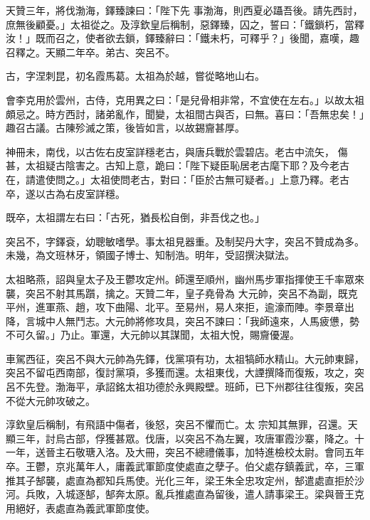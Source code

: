 \begin{pinyinscope}
 天贊三年，將伐渤海，鐸臻諫曰：「陛下先
 事渤海，則西夏必躡吾後。請先西討，庶無後顧憂。」太祖從之。及淳欽皇后稱制，惡鐸臻，囚之，誓曰：「鐵鎖朽，當釋汝！」既而召之，使者欲去鎖，鐸臻辭曰：「鐵未朽，可釋乎？」後聞，嘉嘆，趣召釋之。天顯二年卒。弟古、突呂不。



 古，字涅刺昆，初名霞馬葛。太祖為於越，嘗從略地山右。



 會李克用於雲州，古侍，克用異之曰：「是兒骨相非常，不宜使在左右。」以故太祖頗忌之。時方西討，諸弟亂作，聞變，太祖間古與否，曰無。喜曰：「吾無忠矣！」趣召古議。古陳殄滅之策，後皆如言，以故錫齎甚厚。



 神冊未，南伐，以古佐右皮室詳穩老古，與唐兵戰於雲碧店。老古中流矢，
 傷甚，太祖疑古陰害之。古知上意，跪曰：「陛下疑臣恥居老古麾下耶？及今老古在，請遣使問之。」太祖使問老古，對曰：「臣於古無可疑者。」上意乃釋。老古卒，遂以古為右皮室詳穩。



 既卒，太祖謂左右曰：「古死，猶長松自倒，非吾伐之也。」



 突呂不，字鐸袞，幼聰敏嗜學。事太祖見器重。及制契丹大字，突呂不贊成為多。未幾，為文班林牙，領國子博士、知制浩。明年，受詔撰決獄法。



 太祖略燕，詔與皇太子及王鬱攻定州。師還至順州，幽州馬步軍指揮使王千率眾來襲，突呂不射其馬躓，擒之。天贊二年，皇子堯骨為
 大元帥，突呂不為副，既克平州，進軍燕、趙，攻下曲陽、北平。至易州，易人來拒，逾濠而陣。李景章出降，言城中人無鬥志。大元帥將修攻具，突呂不諫曰：「我師遠來，人馬疲憊，勢不可久留。」乃止。軍還，大元帥以其謀聞，太祖大悅，賜齎優渥。



 車駕西征，突呂不與大元帥為先鐸，伐黨項有功，太祖犒師水精山。大元帥東歸，突呂不留屯西南部，復討黨項，多獲而還。太祖東伐，大諲撰降而復叛，攻之，突呂不先登。渤海平，承詔銘太祖功德於永興殿壁。班師，已下州郡往往復叛，突呂不從大元帥攻破之。



 淳欽皇后稱制，有飛語中傷者，後怒，突呂不懼而亡。太
 宗知其無罪，召還。天顯三年，討烏古部，俘獲甚眾。伐唐，以突呂不為左翼，攻唐軍霞沙寨，降之。十一年，送晉主石敬瑭入洛。及大冊，突呂不總禮儀事，加特進檢校太尉。會同五年卒。王鬱，京兆萬年人，庸義武軍節度使處直之孽子。伯父處存鎮義武，卒，三軍推其子郜襲，處直為都知兵馬使。光化三年，梁王朱全忠攻定州，郜遣處直拒於沙河。兵敗，入城逐郜，郜奔太原。亂兵推處直為留後，遣人請事梁王。梁與晉王克用絕好，表處直為義武軍節度使。




\end{pinyinscope}
